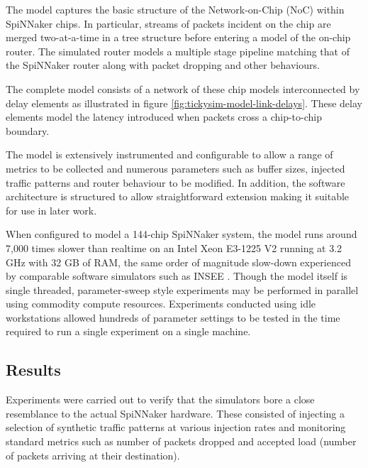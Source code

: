 			The model captures the basic structure of the Network-on-Chip (NoC) within
			SpiNNaker chips. In particular, streams of packets incident on the chip
			are merged two-at-a-time in a tree structure before entering a model of
			the on-chip router. The simulated router models a multiple stage pipeline
			matching that of the SpiNNaker router along with packet dropping and other
			behaviours.
			
			The complete model consists of a network of these chip models
			interconnected by delay elements as illustrated in figure
			\ref{fig:tickysim-model-link-delays}.  These delay elements model the
			latency introduced when packets cross a chip-to-chip boundary.
			
			The model is extensively instrumented and configurable to allow a range of
			metrics to be collected and numerous parameters such as buffer sizes,
			injected traffic patterns and router behaviour to be modified. In
			addition, the software architecture is structured to allow straightforward
			extension making it suitable for use in later work.
			
			When configured to model a 144-chip SpiNNaker system, the model runs
			around 7,000 times slower than realtime on an Intel Xeon E3-1225 V2
			running at 3.2 GHz with 32 GB of RAM, the same order of magnitude
			slow-down experienced by comparable software simulators such as INSEE
			\cite{navaridas11insee}. Though the model itself is single threaded,
			parameter-sweep style experiments may be performed in parallel using
			commodity compute resources. Experiments conducted using idle workstations
			allowed hundreds of parameter settings to be tested in the time required
			to run a single experiment on a single machine.
		
		\subsection{Results}
			
			
			Experiments were carried out to verify that the simulators bore a close
			resemblance to the actual SpiNNaker hardware. These consisted of injecting
			a selection of synthetic traffic patterns at various injection rates and
			monitoring standard metrics such as number of packets dropped and accepted
			load (number of packets arriving at their destination).
			
